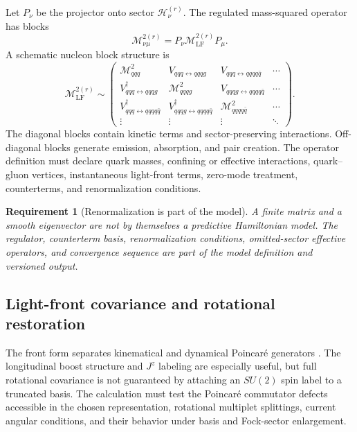 \documentclass[11pt]{article}
\newtheorem{requirement}[definition]{Requirement}
\newcommand{\Hil}{\mathcal H}
\newcommand{\LF}{\mathrm{LF}}
\newcommand{\cM}{\mathcal M}
\begin{document}
Let \(P_\nu\) be the projector onto sector \(\Hil_\nu^{(r)}\).  The regulated
mass-squared operator has blocks
\begin{equation}
 \cM_{\nu\mu}^{2(r)}
 =P_\nu\cM_{\LF}^{2(r)}P_\mu.
\label{eq:mass-blocks}
\end{equation}
A schematic nucleon block structure is
\begin{equation}
\cM_{\LF}^{2(r)}\sim
\begin{pmatrix}
 \cM^2_{qqq} & V_{qqq\leftrightarrow qqqg}
 &V_{qqq\leftrightarrow qqqq\bar q}&\cdots\\
 V^\dagger_{qqq\leftrightarrow qqqg}&\cM^2_{qqqg}
 &V_{qqqg\leftrightarrow qqqq\bar q}&\cdots\\
 V^\dagger_{qqq\leftrightarrow qqqq\bar q}
 &V^\dagger_{qqqg\leftrightarrow qqqq\bar q}
 &\cM^2_{qqqq\bar q}&\cdots\\
 \vdots&\vdots&\vdots&\ddots
\end{pmatrix}.
\label{eq:block-mass-operator}
\end{equation}
The diagonal blocks contain kinetic terms and sector-preserving interactions.
Off-diagonal blocks generate emission, absorption, and pair creation.  The
operator definition must declare quark masses, confining or effective
interactions, quark--gluon vertices, instantaneous light-front terms,
zero-mode treatment, counterterms, and renormalization conditions.

\begin{requirement}[Renormalization is part of the model]
A finite matrix and a smooth eigenvector are not by themselves a predictive
Hamiltonian model.  The regulator, counterterm basis, renormalization
conditions, omitted-sector effective operators, and convergence sequence are
part of the model definition and versioned output.
\end{requirement}

\subsection{Light-front covariance and rotational restoration}

The front form separates kinematical and dynamical Poincar\'e generators \cite{Dirac1949,Brodsky1998}.
The longitudinal boost structure and \(J^z\) labeling are especially useful,
but full rotational covariance is not guaranteed by attaching an
\(SU(2)\) spin label to a truncated basis.  The calculation must test the
Poincar\'e commutator defects accessible in the chosen representation,
rotational multiplet splittings, current angular conditions, and their
behavior under basis and Fock-sector enlargement.
\end{document}

